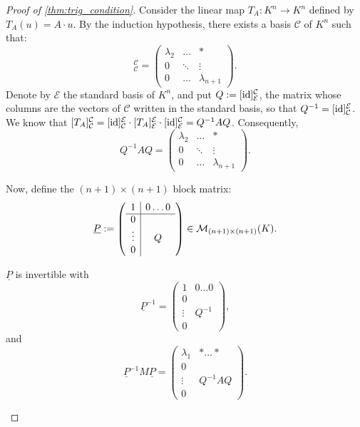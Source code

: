 \begin{proof}[Proof of \cref{thm:trig_condition}]
  Consider the linear map $T_A : K^n \rightarrow K^n$ defined by $T_A(u) = A \cdot u$.
  By the induction hypothesis, there exists a basis $\mathcal{C}$ of $K^n$ such that:
  \begin{equation}
    [T_A]_{\mathcal{C}}^{\mathcal{C}} = \begin{pmatrix} \lambda_2 & \dots & * \\ 0 & \ddots & \vdots \\ 0 & \dots & \lambda_{n+1} \end{pmatrix}.
  \end{equation}
  Denote by $\mathcal{E}$ the standard basis of $K^n$, and put $Q := [\operatorname{id}]_{\mathcal{E}}^{\mathcal{C}}$, the matrix whose columns are the vectors of $\mathcal{C}$ written in the standard basis, so that $Q^{-1} = [\operatorname{id}]_{\mathcal{C}}^{\mathcal{E}}$. We know that $[T_A]_{\mathcal{C}}^{\mathcal{C}} = [\operatorname{id}]_{\mathcal{C}}^{\mathcal{E}} \cdot [T_A]_{\mathcal{E}}^{\mathcal{E}} \cdot [\operatorname{id}]_{\mathcal{E}}^{\mathcal{C}} = Q^{-1}AQ$.
  Consequently,
  \[
  Q^{-1}AQ = \begin{pmatrix} \lambda_2 & \dots & * \\ 0 & \ddots & \vdots \\ 0 & \dots & \lambda_{n+1} \end{pmatrix}.
  \]
  
  \noindent
  Now, define the $(n+1) \times (n+1)$ block matrix:
  \begin{equation} \label{eq:P_underline}
    \underline{P} := \left(\begin{array}{c|c} 1 & 0 \dots 0 \\ \hline 0 & \\ \vdots & Q \\ 0 & \end{array}\right) \in \mathcal{M}_{(n+1) \times (n+1)}(K).
  \end{equation}

  \begin{claim*}\label{claim:P_invertible_trig}
    $\underline{P}$ is invertible with
    \[
    \underline{P}^{-1} = \left(\begin{array}{c|c} 1 & 0 \dots 0 \\ \hline 0 & \\ \vdots & Q^{-1} \\ 0 & \end{array}\right),
    \]
    and
    \[
    \underline{P}^{-1}M\underline{P} = \left(\begin{array}{c|c} \lambda_1 & * \dots * \\ \hline 0 & \\ \vdots & Q^{-1}AQ \\ 0 & \end{array}\right).
    \]
  \end{claim*}


\end{proof}
